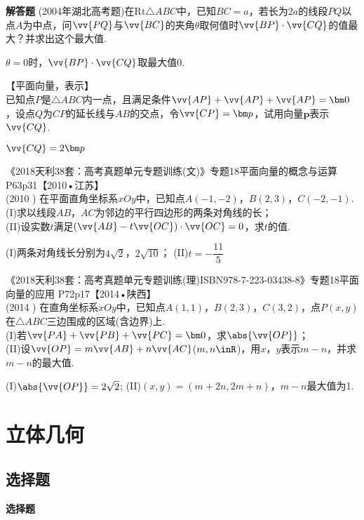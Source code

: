 \begin{exercise}{\bf 解答题}
      (2004年湖北高考题)在$\mathrm{Rt}\triangle{ABC}$中，已知$BC=a$，若长为$2a$的线段$PQ$以点$A$为中点，问$\vv{PQ}$与$\vv{BC}$的夹角$\theta$取何值时$\vv{BP}\cdot\vv{CQ}$的值最大？并求出这个最大值.
      \begin{answer}
        $\theta=0$时，$\vv{BP}\cdot\vv{CQ}$取最大值0.
      \end{answer}
    \item 【平面向量，表示】\\
      已知点$P$是$\triangle{ABC}$内一点，且满足条件$\vv{AP}+\vv{AP}+\vv{AP}=\bm 0$，设点$Q$为$CP$的延长线与$AB$的交点，令$\vv{CP}=\bm p$，试用向量$\bm p$表示$\vv{CQ}$.
      \begin{answer}
        $\vv{CQ}=2\bm p$
      \end{answer}
    \item 《2018天利38套：高考真题单元专题训练(文)》专题18平面向量的概念与运算 P63p31【2010•江苏】\\
      (2010 )
      在平面直角坐标系$xOy$中，已知点$A(-1,-2)$，$B(2,3)$，$C(-2,-1)$.\\
      (I)求以线段$AB$，$AC$为邻边的平行四边形的两条对角线的长；\\
      (II)设实数$t$满足$(\vv{AB}-t\vv{OC})\cdot\vv{OC}=0$，求$t$的值.
      \begin{answer}
        (I)两条对角线长分别为$4\sqrt2$，$2\sqrt{10}$；
        (II)$t=-\dfrac{11}5$
      \end{answer}
    \item 《2018天利38套：高考真题单元专题训练(理)ISBN978-7-223-03438-8》专题18平面向量的应用 P72p17【2014•陕西】\\
      (2014 )
      在直角坐标系$xOy$中，已知点$A(1,1)$，$B(2,3)$，$C(3,2)$，点$P(x,y)$在$\triangle{ABC}$三边围成的区域(含边界)上.\\
      (I)若$\vv{PA}+\vv{PB}+\vv{PC}=\bm 0$，求$\abs{\vv{OP}}$；\\
      (II)设$\vv{OP}=m\vv{AB}+n\vv{AC}$($m,n\inR$)，用$x$，$y$表示$m-n$，并求$m-n$的最大值.
      \begin{answer}
        (I)$\abs{\vv{OP}}=2\sqrt2$;
        (II)$(x,y)=(m+2n,2m+n)$，$m-n$最大值为1.
      \end{answer}
  \end{exercise}
\section{立体几何}
  \subsection{选择题}
  \begin{exercise}{\bf 选择题}
  \end{exercise}
